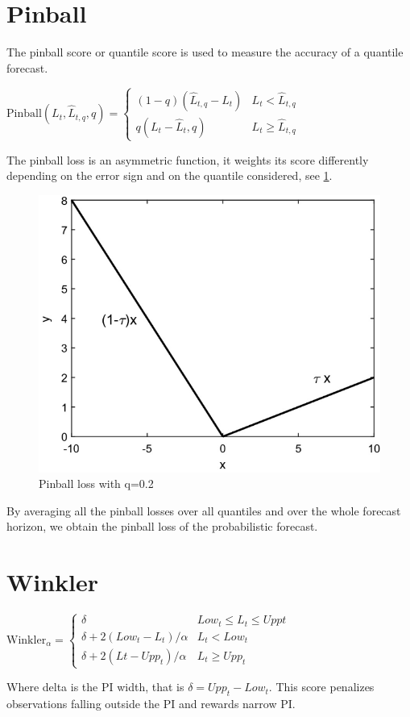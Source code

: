 \section{Pinball}\label{pinball}
The pinball score or quantile score is used to measure the accuracy of a quantile forecast.
\begin{definition}
    $\mathrm{Pinball}(L_{t},\hat{L}_{t,q},q)=
\begin{cases}
(1-q)(\hat{L}_{t,q}-L_{t}) & L_t < \hat{L}_{t,q} \\
q(L_t-\hat{L}_t,q) & L_t \geq \hat{L}_{t,q}
\end{cases}$
\end{definition}
The pinball loss is an asymmetric function, it weights its score differently depending on the error sign and on the quantile considered, see \ref{fig:pinball}.
\begin{figure}
    \includegraphics[width=\textwidth]{images/pinball_loos.png}
    \caption{Pinball loss with q=0.2 \cite{haben2023core}}
    \label{fig:pinball}
  \end{figure}
By averaging all the pinball losses over all quantiles and over the whole forecast horizon, we obtain the pinball loss of the probabilistic forecast.
\section{Winkler}
\begin{definition}
    $\mathrm{Winkler}_{\alpha}=\begin{cases}
        \delta & Low_{t}\leq L_{t}\leq Upp{t}\\
        \delta+2(Low_{t}-L_{t})/\alpha & L_{t}<Low_{t}\\
        \delta+2(L{t}-Upp_{t})/\alpha & L_{t} \geq Upp_{t}
    \end{cases}$
\end{definition}
Where delta is the PI width, that is $\delta=Upp_t-Low_t$. This score penalizes observations falling outside the PI and rewards narrow PI.
